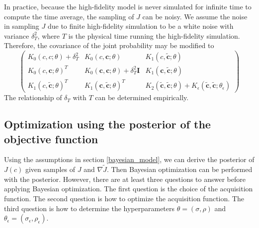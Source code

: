 \documentclass[a4paper,onecolumn]{article}
\theoremstyle{remark}
\begin{document}
In practice, because the high-fidelity model
is never simulated for infinite time to compute the time average,
the sampling of $J$ can be noisy. We assume the noise in sampling $J$
due to finite high-fidelity simulation to be a white noise with variance $\delta^2_T$,
where $T$ is the physical time running the high-fidelity simulation.
Therefore, the covariance of the joint probability may be modified to
\begin{equation}
    \begin{pmatrix}
        K_0 (c, c; \theta)+\delta^2_T & K_0(c, \mathbf{c};\theta) & K_1(c, \tilde{\mathbf{c}}; \theta)\\
        K_0 (c, \mathbf{c}; \theta)^T & K_0(\mathbf{c}, \mathbf{c};\theta) + \delta^2_T \boldsymbol{I}
        & K_1(\mathbf{c}, \tilde{\mathbf{c}}; \theta)\\
        K_1(c, \tilde{\mathbf{c}}; \theta)^T & K_1(\mathbf{c},\tilde{\mathbf{c}}; \theta)^T &
        K_2(\tilde{\mathbf{c}}, \tilde{\mathbf{c}}; \theta) + 
        K_\epsilon (\tilde{\mathbf{c}}, \tilde{\mathbf{c}}; \theta_\epsilon)
    \end{pmatrix}
\end{equation}
The relationship of $\delta_T$ with $T$ can be determined empirically.


\subsection{Optimization using the posterior of the objective function}
\label{bayesian_opt}
\noindent Using the assumptions in section \ref{bayesian_model}, we can derive the posterior
of $J(c)$ given samples of $J$ and $\nabla \tilde{J}$. 
Then Bayesian optimization can be performed with the posterior.
However, there are at least three questions to answer before applying Bayesian optimization.
The first question is the choice of the acquisition function.
The second question is how to optimize the acquisition function.
The third question is how to determine the hyperparameters $\theta = (\sigma, \rho)$ 
and $\theta_\epsilon = (\sigma_\epsilon, \rho_\epsilon)$.
\\
\end{document}
